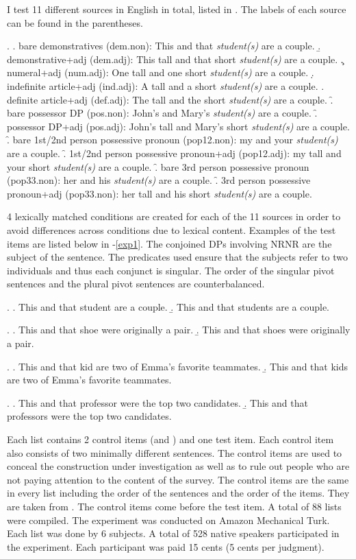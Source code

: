 \documentclass[
  11pt          %
  ,letterpaper  %
  ,center       %
  ,noupper      %
  ]{uconnthesis2}
\begin{document}
I test 11 different sources in English in total, listed in \Next. The labels of each source can be found in the parentheses. 

\ex.
\a. bare demonstratives (dem.non): This and that \textit{student(s)} are a couple.
\b. demonstrative+adj (dem.adj): This tall and that short \textit{student(s)} are a couple.
\c. numeral+adj (num.adj): One tall and one short \textit{student(s)} are a couple.
\d. indefinite article+adj (ind.adj): A tall and a short \textit{student(s)} are a couple.
\e. definite article+adj (def.adj): The tall and the short \textit{student(s)} are a couple.
\f. bare possessor DP (pos.non): John's and Mary's \textit{student(s)} are a couple.
\f. possessor DP+adj (pos.adj): John's tall and Mary's short \textit{student(s)} are a couple.
\f. bare 1st/2nd person possessive pronoun (pop12.non): my and your \textit{student(s)} are a couple.
\f. 1st/2nd person possessive pronoun+adj (pop12.adj): my tall and your short \textit{student(s)} are a couple.
\f. bare 3rd person possessive pronoun (pop33.non): her and his \textit{student(s)} are a couple.
\f. 3rd person possessive pronoun+adj (pop33.non): her tall and his short \textit{student(s)} are a couple.

4 lexically matched conditions are created for each of the 11 sources in order to avoid differences across conditions due to lexical content. Examples of the test items are listed below in \Next-\ref{exp1}. The conjoined DPs involving NRNR are the subject of the sentence. The predicates used ensure that the subjects refer to two individuals and thus each conjunct is singular. The order of the singular pivot sentences and the plural pivot sentences are counterbalanced. 

\ex. 
\a. This and that student are a couple.
\b. This and that students are a couple.

\ex. 
\a. This and that shoe were originally a pair.
\b. This and that shoes were originally a pair.

\ex.
\a. This and that kid are two of Emma's favorite teammates.
\b. This and that kids are two of Emma's favorite teammates.

\ex.\label{exp1} 
\a. This and that professor were the top two candidates.
\b. This and that professors were the top two candidates.

Each list contains 2 control items (\Next and \NNext) and one test item. Each control item also consists of two minimally different sentences. The control items are used to conceal the construction under investigation as well as to rule out people who are not paying attention to the content of the survey. The control items are the same in every list including the order of the sentences and the order of the items. They are taken from \citealt{Sprouse:2013}. The control items come before the test item. A total of 88 lists were compiled. The experiment was conducted on Amazon Mechanical Turk. Each list was done by 6 subjects. A total of 528 native speakers participated in the experiment. Each participant was paid 15 cents (5 cents per judgment).
\end{document}
